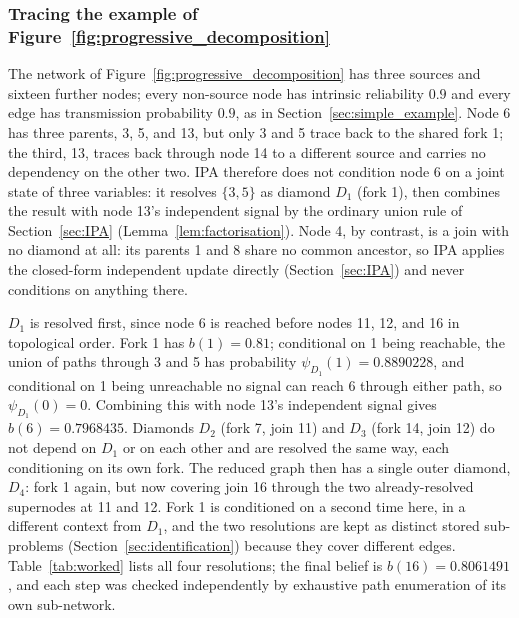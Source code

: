 \documentclass[preprint,12pt]{elsarticle}
\begin{document}
\subsubsection{Tracing the example of Figure~\ref{fig:progressive_decomposition}}\label{sec:worked}

The network of Figure~\ref{fig:progressive_decomposition} has three sources and sixteen further nodes; every non-source node has intrinsic reliability $0.9$ and every edge has transmission probability $0.9$, as in Section~\ref{sec:simple_example}. Node 6 has three parents, 3, 5, and 13, but only 3 and 5 trace back to the shared fork 1; the third, 13, traces back through node 14 to a different source and carries no dependency on the other two. IPA therefore does not condition node 6 on a joint state of three variables: it resolves $\{3,5\}$ as diamond $D_1$ (fork 1), then combines the result with node 13's independent signal by the ordinary union rule of Section~\ref{sec:IPA} (Lemma~\ref{lem:factorisation}). Node 4, by contrast, is a join with no diamond at all: its parents 1 and 8 share no common ancestor, so IPA applies the closed-form independent update directly (Section~\ref{sec:IPA}) and never conditions on anything there.

$D_1$ is resolved first, since node 6 is reached before nodes 11, 12, and 16 in topological order. Fork 1 has $b(1)=0.81$; conditional on 1 being reachable, the union of paths through 3 and 5 has probability $\psi_{D_1}(1)=0.8890228$, and conditional on 1 being unreachable no signal can reach 6 through either path, so $\psi_{D_1}(0)=0$. Combining this with node 13's independent signal gives $b(6)=0.7968435$. Diamonds $D_2$ (fork 7, join 11) and $D_3$ (fork 14, join 12) do not depend on $D_1$ or on each other and are resolved the same way, each conditioning on its own fork. The reduced graph then has a single outer diamond, $D_4$: fork 1 again, but now covering join 16 through the two already-resolved supernodes at 11 and 12. Fork 1 is conditioned on a second time here, in a different context from $D_1$, and the two resolutions are kept as distinct stored sub-problems (Section~\ref{sec:identification}) because they cover different edges. Table~\ref{tab:worked} lists all four resolutions; the final belief is $b(16)=0.8061491$, and each step was checked independently by exhaustive path enumeration of its own sub-network.
\end{document}
